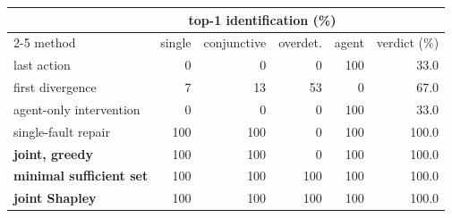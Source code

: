 \begin{tabular}{lrrrrr}
\toprule
& \multicolumn{4}{c}{top-1 identification (\%)} & \\
\cmidrule(lr){2-5}
method & single & conjunctive & overdet. & agent & verdict (\%) \\
\midrule
last action & 0 & 0 & 0 & 100 & 33.0 \\
first divergence & 7 & 13 & 53 & 0 & 67.0 \\
agent-only intervention & 0 & 0 & 0 & 100 & 33.0 \\
single-fault repair & 100 & 100 & 0 & 100 & 100.0 \\
\bfseries joint, greedy & 100 & 100 & 0 & 100 & 100.0 \\
\bfseries minimal sufficient set & 100 & 100 & 100 & 100 & 100.0 \\
\bfseries joint Shapley & 100 & 100 & 100 & 100 & 100.0 \\
\bottomrule
\end{tabular}
